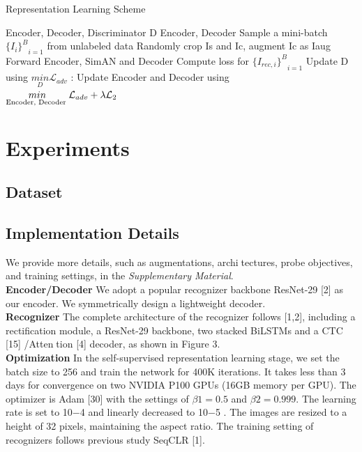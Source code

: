 \documentclass{article}
\begin{document}
\begin{multicols}{2}
\begin{algorithm}[H]
    \caption{Representation Learning Scheme}
    \label{algo_2}
    \begin{algorithmic}[1]
    \Require  Encoder, Decoder, Discriminator D
    \Ensure  Encoder, Decoder
    \State Sample a mini-batch ${{\{I_i\}}^B}_{i=1}$ from unlabeled data
    \State Randomly crop Is and Ic, augment Ic as Iaug 
    \EndFor
    \State Forward Encoder, SimAN and Decoder
    \State Compute loss for  ${{\{I_{rec,i}\}}^B}_{i=1}$
    \State Update D using $\underset{D}{min }  \mathcal {L}_{adv}$
    \State : Update Encoder and Decoder using \\
              $\small \underset{\text {Encoder, Decoder }}{min} \mathcal {L}_{adv} + \lambda\mathcal{L}_2 $
    \end{algorithmic}
\end{algorithm}

\section{Experiments}
\subsection{ Dataset}
\subsection{Implementation Details}
\hspace{5pt} We provide more details, such as augmentations, architectures, probe objectives, and training settings, in the \textit{Supplementary Material}.\\
 \hspace{5pt} \textbf{Encoder/Decoder} We adopt a popular recognizer backbone ResNet-29 [2] as our encoder. We symmetrically design a lightweight decoder.\\
\hspace{5pt} \textbf{Recognizer} The complete architecture of the recognizer
follows [1,2], including a rectification module, a ResNet-29
backbone, two stacked BiLSTMs and a CTC [15] /Attention [4] decoder, as shown in Figure 3.\\
\hspace{5pt} \textbf{Optimization} In the self-supervised representation
learning stage, we set the batch size to 256 and train the
network for 400K iterations. It takes less than 3 days for
convergence on two NVIDIA P100 GPUs (16GB memory
per GPU). The optimizer is Adam [30] with the settings
of $\beta1 = 0.5$ and $\beta2 = 0.999$. The learning rate is set to
10−4
and linearly decreased to 10−5
. The images are resized to a height of 32 pixels, maintaining the aspect ratio.
The training setting of recognizers follows previous study
SeqCLR [1].


\end{multicols}
\end{document}
